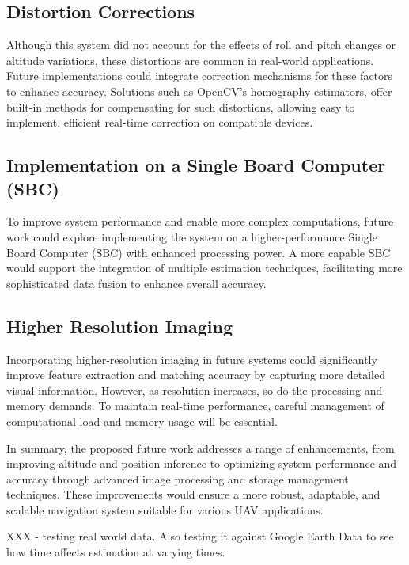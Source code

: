 \subsection{Distortion Corrections}

Although this system did not account for the effects of roll and pitch changes or altitude variations, these distortions are common in real-world applications. Future implementations could integrate correction mechanisms for these factors to enhance accuracy. Solutions such as OpenCV’s homography estimators, offer built-in methods for compensating for such distortions, allowing easy to implement, efficient real-time correction on compatible devices.


\subsection{Implementation on a Single Board Computer (SBC)}

To improve system performance and enable more complex computations, future work could explore implementing the system on a higher-performance Single Board Computer (SBC) with enhanced processing power. A more capable SBC would support the integration of multiple estimation techniques, facilitating more sophisticated data fusion to enhance overall accuracy. 

\subsection{Higher Resolution Imaging}

Incorporating higher-resolution imaging in future systems could significantly improve feature extraction and matching accuracy by capturing more detailed visual information. However, as resolution increases, so do the processing and memory demands. To maintain real-time performance, careful management of computational load and memory usage will be essential. 


In summary, the proposed future work addresses a range of enhancements, from improving altitude and position inference to optimizing system performance and accuracy through advanced image processing and storage management techniques. These improvements would ensure a more robust, adaptable, and scalable navigation system suitable for various UAV applications.



XXX - testing real world data. Also testing it against Google Earth Data to see how time affects estimation at varying times. 